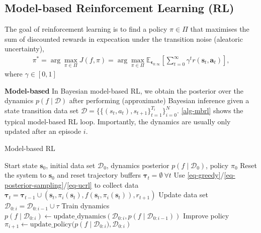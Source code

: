 \documentclass{article}
\newcommand{\state}{\ensuremath{\mathbf{s}}}
\newcommand{\action}{\ensuremath{\mathbf{a}}}
\newcommand{\noise}{\ensuremath{\bm\epsilon}}
\newcommand{\discount}{\ensuremath{\gamma}}
\newcommand{\dataset}{\ensuremath{\mathcal{D}}}
\newcommand{\policyDomain}{\ensuremath{\Pi}}
\newcommand{\rewardFn}{\ensuremath{r}}
\newcommand{\transitionFn}{\ensuremath{f}}
\newcommand{\policy}{\ensuremath{\pi}}
\begin{document}
\subsection{Model-based Reinforcement Learning (RL)}
The goal of reinforcement learning is to find a policy \(\pi \in \Pi\) that maximises the sum of discounted
rewards in expecation under the transition noise (aleatoric uncertainty),
\begin{align} \label{eq-model-free-objective}
\policy^{*} = \arg \max_{\policy \in \policyDomain} J(\transitionFn, \policy) = \arg \max_{\policy \in \policyDomain} \mathbb{E}_{\noise_{0:\infty}} \left[ \sum_{t=0}^{\infty} \discount^{t} \rewardFn(\state_{t},\action_{t}) \right],
\end{align}
where $\gamma \in [0, 1]$

\textbf{Model-based}
In Bayesian model-based RL, we obtain the posterior over the dynamics \(p(f\mid\mathcal{D})\) after performing (approximate) Bayesian
inference given a state transition data set \(\mathcal{D} = \{\{(s_{t},a_{t}), s_{t+1}\}^{T_{i}}_{t=1}\}_{i=0}^{N}\).
\cref{alg-mbrl} shows the typical model-based RL loop.
Importantly, the dynamics are usually only updated after an episode $i$.

\begin{algorithm}[!t]
\caption{Model-based RL}\label{alg-mbrl}
\begin{algorithmic}[1]
  \Require Start state $\state_{0}$, initial data set $\dataset_{0}$, dynamics posterior $p(\transitionFn \mid \dataset_{0})$, policy $\policy_{0}$
    \State Reset the system to $\state_{0}$ and reset trajectory buffers $\bm\tau_{t} = \emptyset \ \forall t$
      \State Use \cref{eq-greedy}/\cref{eq-posterior-sampling}/\cref{eq-ucrl} to collect data $\bm\tau_{t} = \bm\tau_{t-1} \cup (\state_{t}, \policy_{i}(\state_{t}), \transitionFn(\state_{t}, \policy_{i}(\state_{t})), r_{t+1})$
    \EndFor
    \State Update data set $\dataset_{0:i} = \dataset_{0:i-1} \cup \tau$
    \State Train dynamics $p(\transitionFn \mid \dataset_{0:i}) \leftarrow \text{update\_dynamics}(\dataset_{0:i}, p(\transitionFn \mid \dataset_{0:i-1}))$
    \State Improve policy $\pi_{i+1} \leftarrow \text{update\_policy}(p\left(\transitionFn \mid \dataset_{0:i}), \dataset_{0:i} \right)$
\EndFor
\end{algorithmic}
\end{algorithm}
\end{document}
